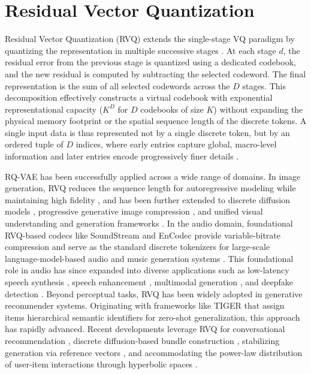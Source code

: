 \documentclass[12pt]{report}
\begin{document}
\section{Residual Vector Quantization}
\label{sec:rvq}

Residual Vector Quantization (RVQ) extends the single-stage VQ paradigm by quantizing the representation in multiple successive stages \cite{soundstream}. At each stage $d$, the residual error from the previous stage is quantized using a dedicated codebook, and the new residual is computed by subtracting the selected codeword. The final representation is the sum of all selected codewords across the $D$ stages. This decomposition effectively constructs a virtual codebook with exponential representational capacity ($K^D$ for $D$ codebooks of size $K$) without expanding the physical memory footprint or the spatial sequence length of the discrete tokens. A single input data is thus represented not by a single discrete token, but by an ordered tuple of $D$ indices, where early entries capture global, macro-level information and later entries encode progressively finer details \cite{lee2022rqvae}.

RQ-VAE has been successfully applied across a wide range of domains. In image generation, RVQ reduces the sequence length for autoregressive modeling while maintaining high fidelity \cite{lee2022rqvae}, and has been further extended to discrete diffusion models \cite{resgen}, progressive generative image compression \cite{progic}, and unified visual understanding and generation frameworks \cite{evotok}. In the audio domain, foundational RVQ-based codecs like SoundStream \cite{soundstream} and EnCodec \cite{encodec} provide variable-bitrate compression and serve as the standard discrete tokenizers for large-scale language-model-based audio and music generation systems \cite{audiolm, musicgen}. This foundational role in audio has since expanded into diverse applications such as low-latency speech synthesis \cite{su2026ultralow}, speech enhancement \cite{li2026llsdr}, multimodal generation \cite{ye2026hierarchical}, and deepfake detection \cite{wu2026quantizer}. Beyond perceptual tasks, RVQ has been widely adopted in generative recommender systems. Originating with frameworks like TIGER \cite{tiger} that assign items hierarchical semantic identifiers for zero-shot generalization, this approach has rapidly advanced. Recent developments leverage RVQ for conversational recommendation \cite{talkplay}, discrete diffusion-based bundle construction \cite{ddbc}, stabilizing generation via reference vectors \cite{r3vae}, and accommodating the power-law distribution of user-item interactions through hyperbolic spaces \cite{hyprqvae_recsys}.
\end{document}
